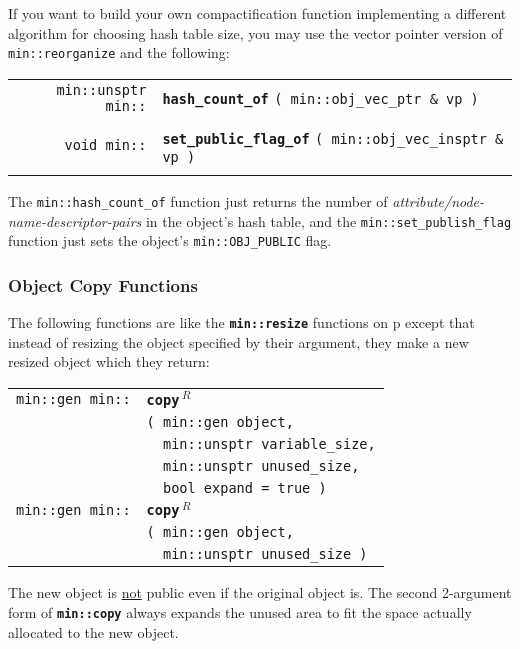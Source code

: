 \documentclass[12pt]{article}
\makeatletter
\newcommand{\TT}[1]{{\tt \bfseries #1}}
\newcommand{\ttindex}[1]{\index{#1@{\tt #1}}}
\newcommand{\pagref}[1]{p\pageref{#1}}
\newcommand{\EOL}{\penalty \exhyphenpenalty}
\newenvironment{indpar}[1][0.3in]%
	{\begin{list}{}%
		     {\setlength{\itemsep}{0in}%
		      \setlength{\topsep}{0in}%
		      \setlength{\parsep}{1ex}%
		      \setlength{\labelwidth}{#1}%
		      \setlength{\leftmargin}{#1}%
		      \addtolength{\leftmargin}{\labelsep}}%
	 \item}%
	{\end{list}}
\newcommand{\LABEL}[1]{\label{#1}}
\newlength{\ARGBREAKLENGTH}
\newcommand{\ARGBREAK}[1][\ARGBREAKLENGTH]{\\&\hspace*{#1}}
\newcommand{\MINKEY}[1]%
	   {\TT{#1}\ttindex{min::#1}\ttindex{#1}}
\newcommand{\REL}{$\,^R$}
\makeatother
\begin{document}
If you want to build your own compactification function implementing
a different algorithm for choosing hash table size, you may use
the vector pointer version of {\tt min::reorganize} and the following:

\begin{indpar}\begin{tabular}{r@{}l}
\verb|min::unsptr min::| & \MINKEY{hash\_count\_of}
    \verb|( min::obj_vec_ptr & vp )| \\
\LABEL{MIN::HASH_COUNT_OF} \\
\verb|void min::| & \MINKEY{set\_public\_flag\_of}
    \verb|( min::obj_vec_insptr & vp )| \\
\LABEL{MIN::SET_PUBLIC_FLAG_OF} \\
\end{tabular}\end{indpar}

The {\tt min::hash\_count\_of} function just returns the number of
{\em attribute/node-name-descrip\-tor-pairs} in the object's hash table,
and the {\tt min::\EOL set\_\EOL publish\_\EOL flag} function just sets
the object's {\tt min::\EOL OBJ\_\EOL PUBLIC} flag.

\subsubsection{Object Copy Functions}
\label{OBJECT-COPY-FUNCTIONS}

The following functions are like the \TT{min::\EOL resize} functions on
\pagref{MIN::RESIZE} except that instead of resizing the object specified
by their argument, they make a new resized object which they return:

\begin{indpar}\begin{tabular}{r@{}l}
\verb|min::gen min::| & \MINKEY{copy\REL}\ARGBREAK
    \verb|( min::gen object,|\ARGBREAK
    \verb|  min::unsptr variable_size,|\ARGBREAK
    \verb|  min::unsptr unused_size,|\ARGBREAK
    \verb|  bool expand = true )|
\LABEL{MIN::COPY} \\
\verb|min::gen min::| & \MINKEY{copy\REL}\ARGBREAK
    \verb|( min::gen object,|\ARGBREAK
    \verb|  min::unsptr unused_size )|
\LABEL{MIN::COPY_UNUSED} \\
\end{tabular}\end{indpar}

The new object is \underline{not} public even if the original
object is.  The second 2-argument form of \TT{min::\EOL copy}
always expands the unused area to fit the space actually allocated
to the new object.
\end{document}
